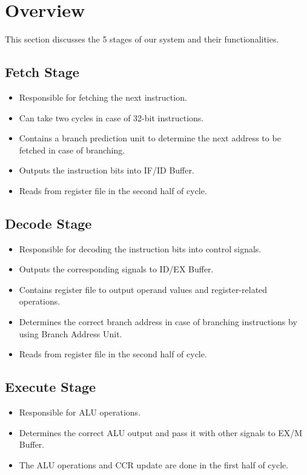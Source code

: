 \section{Overview}
This section discusses the 5 stages of our system and their functionalities.

\subsection{Fetch Stage}
\begin{itemize}
    \item Responsible for fetching the next instruction.
    \item Can take two cycles in case of 32-bit instructions.
    \item Contains a branch prediction unit to determine the next address to be fetched in case of branching.
    \item Outputs the instruction bits into IF/ID Buffer.
    \item Reads from register file in the second half of cycle.
\end{itemize}

\subsection{Decode Stage}
\begin{itemize}
    \item Responsible for decoding the instruction bits into control signals.
    \item Outputs the corresponding signals to ID/EX Buffer.
    \item Contains register file to output operand values and register-related operations.
    \item Determines the correct branch address in case of branching instructions by using Branch Address Unit.
    \item Reads from register file in the second half of cycle.
\end{itemize}

\subsection{Execute Stage}
\begin{itemize}
    \item Responsible for ALU operations.
    \item Determines the correct ALU output and pass it with other signals to EX/M Buffer.
    \item The ALU operations and CCR update are done in the first half of cycle.
\end{itemize}

